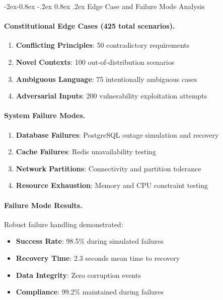\documentclass[manuscript,screen,9pt]{acmart}
\makeatletter
\renewcommand\subsubsection{\@startsection{subsubsection}{3}{\z@}%
  {-2ex\@plus -0.8ex \@minus -.2ex}%
  {0.8ex \@plus .2ex}%
  {\normalfont\normalsize\bfseries}}
\makeatother
\begin{document}
\subsubsection{Edge Case and Failure Mode Analysis}
\label{subsubsec:edge_case_analysis}

\paragraph{Constitutional Edge Cases (425 total scenarios).}
\begin{enumerate}[leftmargin=*,itemsep=1pt,parsep=1pt]
    \item \textbf{Conflicting Principles}: 50 contradictory requirements
    \item \textbf{Novel Contexts}: 100 out-of-distribution scenarios
    \item \textbf{Ambiguous Language}: 75 intentionally ambiguous cases
    \item \textbf{Adversarial Inputs}: 200 vulnerability exploitation attempts
\end{enumerate}

\paragraph{System Failure Modes.}
\begin{enumerate}[leftmargin=*,itemsep=1pt,parsep=1pt]
    \item \textbf{Database Failures}: PostgreSQL outage simulation and recovery
    \item \textbf{Cache Failures}: Redis unavailability testing
    \item \textbf{Network Partitions}: Connectivity and partition tolerance
    \item \textbf{Resource Exhaustion}: Memory and CPU constraint testing
\end{enumerate}

\paragraph{Failure Mode Results.}
Robust failure handling demonstrated:
\begin{itemize}[leftmargin=*,itemsep=1pt,parsep=1pt]
    \item \textbf{Success Rate}: 98.5\% during simulated failures
    \item \textbf{Recovery Time}: 2.3 seconds mean time to recovery
    \item \textbf{Data Integrity}: Zero corruption events
    \item \textbf{Compliance}: 99.2\% maintained during failures
\end{itemize}
\end{document}
